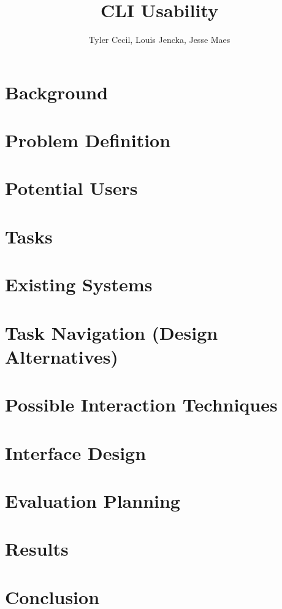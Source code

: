 \documentclass{article}
\title{CLI Usability}
\author{Tyler Cecil, Louis Jencka, Jesse Maes}
\begin{document}
\maketitle{}
\section{Background}
\label{sec:background}


\section{Problem Definition}
\label{sec:problem}


\section{Potential Users}
\label{sec:users}


\section{Tasks}
\label{sec:tasks}


\section{Existing Systems}
\label{sec:existing}



\section{Task Navigation (Design Alternatives)}
\label{sec:tas_nav}


\section{Possible Interaction Techniques}
\label{sec:interact}


\section{Interface Design}
\label{sec:interface}


\section{Evaluation Planning}
\label{sec:eval}


\section{Results}
\label{sec:results}


\section{Conclusion}
\label{sec:conclusion}




\end{document}
